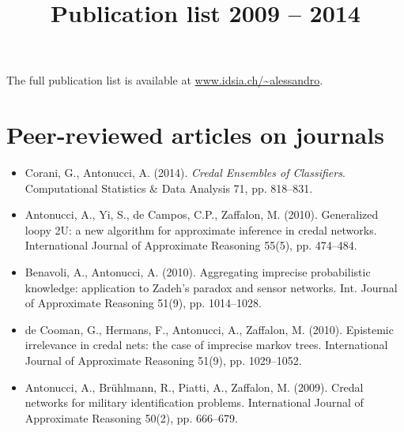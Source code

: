 \documentclass[11pt,a4paper]{moderncv}
\title{Publication list 2009 -- 2014}               %
\begin{document}
\maketitle
The full publication list is available at \url{www.idsia.ch/~alessandro}.

\section{Peer-reviewed articles on journals}
\begin{itemize}
\item Corani, G., Antonucci, A. (2014). \textit{Credal Ensembles of Classifiers}. Computational Statistics \& Data Analysis 71, pp. 818--831.
\item Antonucci, A., Yi, S., de Campos, C.P., Zaffalon, M. (2010). Generalized loopy 2U: a new algorithm for approximate inference in credal networks. International Journal of Approximate Reasoning 55(5), pp. 474--484.
\item Benavoli, A., Antonucci, A. (2010). Aggregating imprecise probabilistic knowledge: application to Zadeh's paradox and sensor networks. Int. Journal of Approximate Reasoning 51(9), pp. 1014--1028.
\item de Cooman, G., Hermans, F., Antonucci, A., Zaffalon, M. (2010). Epistemic irrelevance in credal nets: the case of imprecise markov trees. International Journal of Approximate Reasoning 51(9), pp. 1029--1052.
\item Antonucci, A., Br\"uhlmann, R., Piatti, A., Zaffalon, M. (2009). Credal networks for military identification problems. International Journal of Approximate Reasoning 50(2), pp. 666--679.
\end{itemize}
\end{document}

